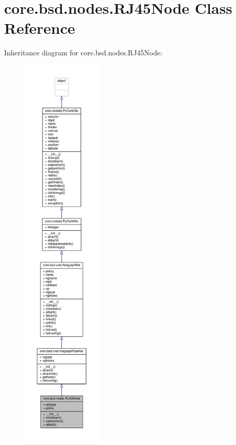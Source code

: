 \hypertarget{classcore_1_1bsd_1_1nodes_1_1_r_j45_node}{\section{core.\+bsd.\+nodes.\+R\+J45\+Node Class Reference}
\label{classcore_1_1bsd_1_1nodes_1_1_r_j45_node}
}


Inheritance diagram for core.\+bsd.\+nodes.\+R\+J45\+Node\+:
\nopagebreak
\begin{figure}[H]
\begin{center}
\leavevmode
\includegraphics[height=550pt]{classcore_1_1bsd_1_1nodes_1_1_r_j45_node__inherit__graph}
\end{center}
\end{figure}


